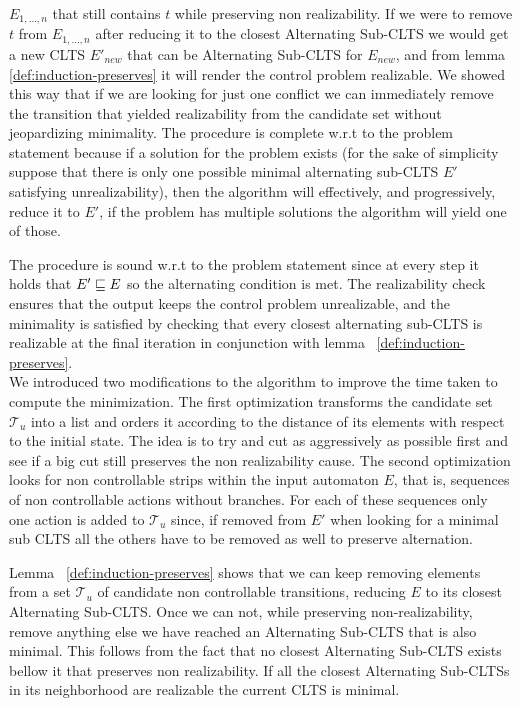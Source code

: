 $E_{1,\ldots,n}$ that still contains $t$ while preserving non realizability.
If we were to remove $t$ from $E_{1,\ldots,n}$ after reducing it
to the closest Alternating Sub-CLTS we would get a new CLTS
$E'_{new}$ that can be Alternating Sub-CLTS for $E_{new}$, and from lemma
\ref{def:induction-preserves} it will render the control problem
realizable.  We showed this way that if we are looking for just one
conflict we can immediately remove the transition that yielded realizability 
from the candidate set without jeopardizing minimality.
%
The procedure is complete w.r.t to the problem statement because
if a solution for the problem exists (for the sake of simplicity
suppose that there is only one possible minimal alternating sub-CLTS $E'$
satisfying unrealizability), then the algorithm will effectively, and progressively,
reduce it to $E'$, if the problem has multiple solutions the
algorithm will yield one of those.

The procedure is sound w.r.t to the problem statement since 
at every step it holds that $E' \sqsubseteq E$ so the alternating condition
is met.  The realizability check ensures that the output keeps the
control problem unrealizable, and the minimality is satisfied by
checking that every closest alternating sub-CLTS is realizable at the
final iteration in conjunction with lemma  ~\ref{def:induction-preserves}.\\

We introduced two modifications to the algorithm
to improve the time taken to compute the minimization.
The first optimization transforms the candidate set $\mathcal{T}_u$
into a list and orders it according to the distance of its elements 
with respect to the initial state.  The idea is to try and cut
as aggressively as possible first and see if a big cut still
preserves the non realizability cause.  The second optimization
looks for non controllable strips within the  input automaton
$E$, that is, sequences of non controllable actions without branches.
For each of these sequences only one action is
added to $\mathcal{T}_u$ since, if removed from $E'$
when looking for a minimal sub CLTS all the others have to be removed
as well to preserve alternation.

Lemma ~\ref{def:induction-preserves} shows that we can keep removing
elements from a set $\mathcal{T}_u$ of candidate non controllable
transitions, reducing $E$ to its closest Alternating Sub-CLTS.
 Once we can not,
while preserving non-realizability, remove
anything else we have reached an Alternating Sub-CLTS that is also minimal.
This follows from the fact that
no closest Alternating Sub-CLTS exists bellow it that preserves non realizability.
If all the closest Alternating Sub-CLTSs in its neighborhood 
are realizable the current CLTS is minimal.


